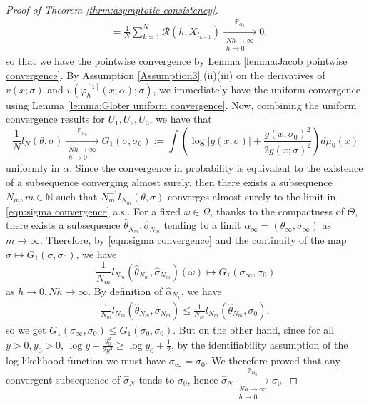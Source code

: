 \documentclass[a4paper,12pt]{article}
\numberwithin{equation}{section}
\theoremstyle{plain}
\theoremstyle{definition}
\begin{document}
\begin{appendix}
\begin{proof}[Proof of Theorem \ref{thrm:asymptotic consistency}]
\begin{align*}
        &=\frac{1}{N}\sum_{k=1}^N\mathcal{R}(h;X_{t_{k-1}})\xrightarrow[\substack{N h\rightarrow\infty \\ h \rightarrow 0}]{\mathbb{P}_{\alpha_0}}0,
    \end{align*}
    so that we have the pointwise convergence by Lemma \ref{lemma:Jacob pointwise convergence}. By Assumption \ref{Assumption3} (ii)(iii) 
    on the derivatives of $v(x;\sigma)$ and $v(\varphi^{[1]}_h(x;\alpha);\sigma)$, we immediately have the uniform convergence using Lemma \ref{lemma:Gloter uniform convergence}. Now, combining the uniform convergence results for $U_1,U_2,U_3$, we have that
\begin{equation}\label{eqn:sigma convergence}
        \frac{1}{N}l_N(\theta,\sigma)\xrightarrow[\substack{N h\rightarrow\infty \\ h \rightarrow 0}]{\mathbb{P}_{\alpha_0}}G_1(\sigma,\sigma_0):=\int \left(\log|g(x;\sigma)|+\frac{g(x;\sigma_0)^2}{2g(x;\sigma)^2}\right)d\mu_0(x)
    \end{equation}
    uniformly in $\alpha$. Since the convergence in probability is equivalent to the existence of a subsequence converging almost surely, then there exists a subsequence $N_m, m\in \mathbb{N}$ 
    such that $N_m^{-1}l_{N_m}(\theta,\sigma)$ converges almost surely to the limit in \eqref{eqn:sigma convergence} a.s..
For a fixed $\omega\in \Omega$, thanks to the compactness of $\Theta$, there exists a subsequence $\hat{\theta}_{N_m},\hat{\sigma}_{N_m}$ tending to a limit $\alpha_\infty=(\theta_\infty,\sigma_\infty)$ as $m\to\infty$. Therefore, by \eqref{eqn:sigma convergence} and the continuity of the map $\sigma\mapsto G_1(\sigma,\sigma_0)$, we have
    \begin{equation*}
        \frac{1}{N_m}l_{N_m}(\hat{\theta}_{N_m},\hat{\sigma}_{N_m})(\omega)\mapsto G_1(\sigma_\infty,\sigma_0)
    \end{equation*}
    as $h\to0,Nh\to \infty$. By definition of $\hat{\alpha}_{N_k}$, we have
    \begin{eqnarray*}
        \frac{1}{N_m}l_{N_m}(\hat{\theta}_{N_m},\hat{\sigma}_{N_m})\leq \frac{1}{N_m}l_{N_m}(\hat{\theta}_{N_m},\sigma_0),
    \end{eqnarray*}
    so we get $G_1(\sigma_\infty,\sigma_0)\leq G_1(\sigma_0,\sigma_0)$. But on the other hand, since for all $y>0,y_0>0$, $\log y+\frac{y_0^2}{2y^2}\geq \log y_0+\frac{1}{2}$, by the identifiability assumption of the log-likelihood function we must have $\sigma_\infty=\sigma_0$. We therefore proved that any convergent subsequence of $\hat{\sigma}_{N}$ tends to $\sigma_0$, hence $\hat{\sigma}_N\xrightarrow[\substack{N h\rightarrow\infty \\ h \rightarrow 0}]{\mathbb{P}_{\alpha_0}}\sigma_0$.
    

\end{proof}
\end{appendix}
\end{document}
